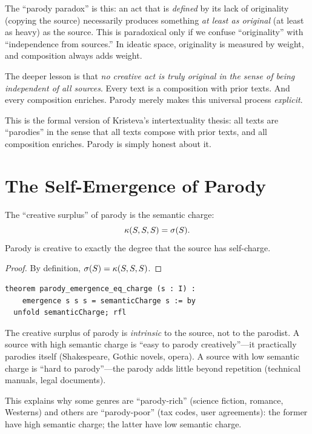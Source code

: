 \begin{interpretation}
The ``parody paradox'' is this: an act that is \emph{defined} by its
lack of originality (copying the source) necessarily produces something
\emph{at least as original} (at least as heavy) as the source.  This
is paradoxical only if we confuse ``originality'' with ``independence
from sources.''  In ideatic space, originality is measured by weight,
and composition always adds weight.

The deeper lesson is that \emph{no creative act is truly original in the
sense of being independent of all sources}.  Every text is a composition
with prior texts.  And every composition enriches.  Parody merely makes
this universal process \emph{explicit}.

This is the formal version of Kristeva's intertextuality thesis:
all texts are ``parodies'' in the sense that all texts compose with prior
texts, and all composition enriches.  Parody is simply honest about it.
\end{interpretation}

\section{The Self-Emergence of Parody}

\begin{theorem}
\label{thm:parody-emergence}
The ``creative surplus'' of parody is the semantic charge:
\[
  \kappa(S, S, S) = \sigma(S).
\]
Parody is creative to exactly the degree that the source has self-charge.
\end{theorem}

\begin{proof}
By definition, $\sigma(S) = \kappa(S, S, S)$.
\end{proof}

\begin{lstlisting}
theorem parody_emergence_eq_charge (s : I) :
    emergence s s s = semanticCharge s := by
  unfold semanticCharge; rfl
\end{lstlisting}

\begin{remark}
The creative surplus of parody is \emph{intrinsic} to the source, not
to the parodist.  A source with high semantic charge is ``easy to
parody creatively''---it practically parodies itself (Shakespeare,
Gothic novels, opera).  A source with low semantic charge is ``hard to
parody''---the parody adds little beyond repetition (technical manuals,
legal documents).

This explains why some genres are ``parody-rich'' (science fiction,
romance, Westerns) and others are ``parody-poor'' (tax codes, user
agreements): the former have high semantic charge; the latter have low
semantic charge.
\end{remark}


